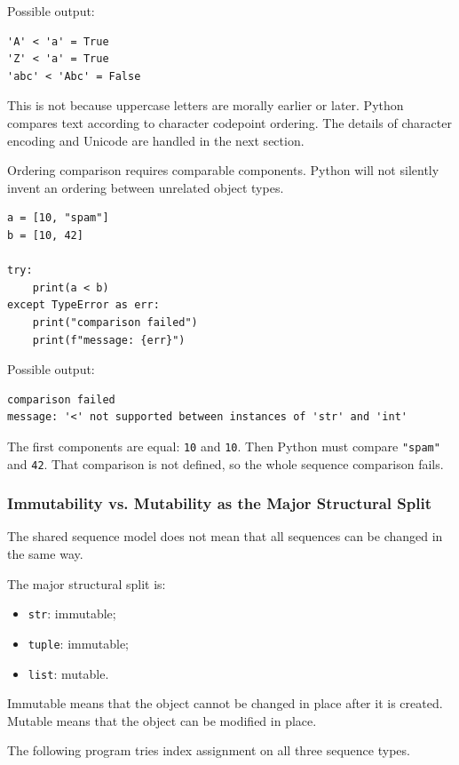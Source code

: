 Possible output:

\begin{verbatim}
'A' < 'a' = True
'Z' < 'a' = True
'abc' < 'Abc' = False
\end{verbatim}

This is not because uppercase letters are morally earlier or later. Python compares text according to character codepoint ordering. The details of character encoding and Unicode are handled in the next section.

Ordering comparison requires comparable components. Python will not silently invent an ordering between unrelated object types.

\begin{verbatim}
a = [10, "spam"]
b = [10, 42]

try:
    print(a < b)
except TypeError as err:
    print("comparison failed")
    print(f"message: {err}")
\end{verbatim}

Possible output:

\begin{verbatim}
comparison failed
message: '<' not supported between instances of 'str' and 'int'
\end{verbatim}

The first components are equal: \texttt{10} and \texttt{10}. Then Python must compare \texttt{"spam"} and \texttt{42}. That comparison is not defined, so the whole sequence comparison fails.

\subsubsection{Immutability vs. Mutability as the Major Structural Split}

The shared sequence model does not mean that all sequences can be changed in the same way.

The major structural split is:

\begin{itemize}
    \item \texttt{str}: immutable;
    \item \texttt{tuple}: immutable;
    \item \texttt{list}: mutable.
\end{itemize}

Immutable means that the object cannot be changed in place after it is created. Mutable means that the object can be modified in place.

The following program tries index assignment on all three sequence types.


